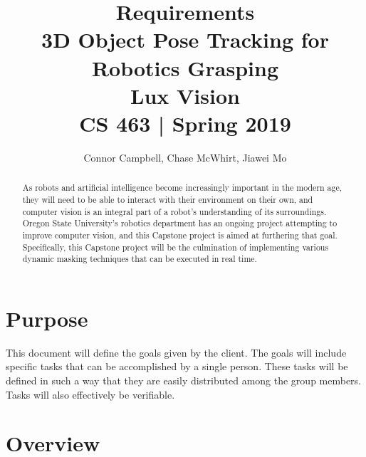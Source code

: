\documentclass[10pt,journal,compsoc, draftclsnofoot,onecolumn]{IEEEtran}
\title{
    Requirements
    \\3D Object Pose Tracking for Robotics Grasping
    \\Lux Vision
    \\CS 463 | Spring 2019
}
\author{Connor Campbell, Chase McWhirt, Jiawei Mo}
\begin{document}
\maketitle

\begin{abstract}
As robots and artificial intelligence become increasingly important in the modern age, they will need to be able to interact with their environment on their own, and computer vision is an integral part of a robot's understanding of its surroundings.
Oregon State University's robotics department has an ongoing project attempting to improve computer vision, and this Capstone project is aimed at furthering that goal.
Specifically, this Capstone project will be the culmination of implementing various dynamic masking techniques that can be executed in real time.
\end{abstract}
\pagebreak


\tableofcontents
\pagebreak


\section{Purpose}
This document will define the goals given by the client.
The goals will include specific tasks that can be accomplished by a single person.
These tasks will be defined in such a way that they are easily distributed among the group members.
Tasks will also effectively be verifiable.




\section{Overview}
\end{document}
